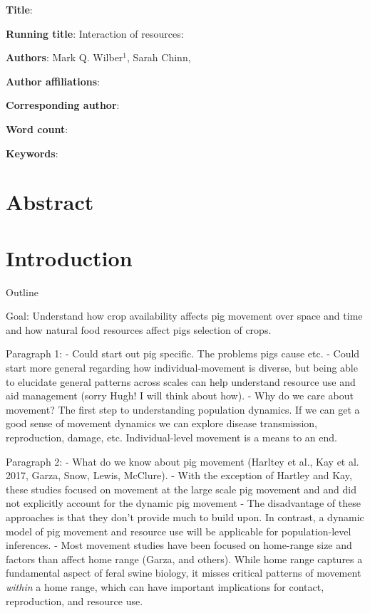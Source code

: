 \documentclass[a4paper]{article}
\begin{document}
\noindent
\textbf{Title}: 

\bigskip

\noindent
\textbf{Running title}: Interaction of resources: 

\bigskip

\noindent
\textbf{Authors}: Mark Q. Wilber$^1$, Sarah Chinn, 

\bigskip

\noindent
\textbf{Author affiliations}: \\

\bigskip

\noindent
\textbf{Corresponding author}:

\bigskip

\noindent
\textbf{Word count}:

\bigskip

\noindent
\textbf{Keywords}:

\newpage

\doublespacing
\linenumbers

\section*{Abstract}

\section*{Introduction}

Outline

Goal: Understand how crop availability affects pig movement over space and time and how natural food resources affect pigs selection of crops.  

Paragraph 1: 
	- Could start out pig specific.  The problems pigs cause etc.
	- Could start more general regarding how individual-movement is diverse, but being able to elucidate general patterns across scales can help understand resource use and aid management (sorry Hugh! I will think about how).
	- Why do we care about movement? The first step to understanding population dynamics.  If we can get a good sense of movement dynamics we can explore disease transmission, reproduction, damage, etc. Individual-level movement is a means to an end. 

Paragraph 2:
	- What do we know about pig movement (Harltey et al., Kay et al. 2017, Garza, Snow, Lewis, McClure).
	- With the exception of Hartley and Kay, these studies focused on movement at the large scale pig movement and and did not explicitly account for the dynamic pig movement\?
	- The disadvantage of these approaches is that they don't provide much to build upon.  In contrast, a dynamic model of pig movement and resource use will be applicable for population-level inferences. 
	-  Most movement studies have been focused on home-range size and factors than affect home range (Garza, and others).  While home range captures a fundamental aspect of feral swine biology, it misses critical patterns of movement \emph{within} a home range, which can have important implications for contact, reproduction, and resource use. 
\end{document}
